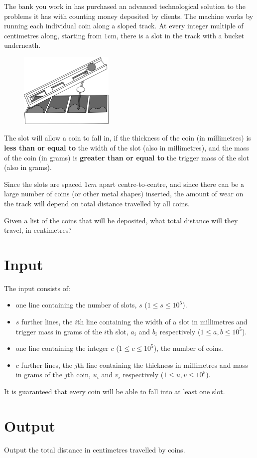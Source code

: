 
The bank you work in has purchased an advanced technological solution to the
problems it has with counting money deposited by clients.
The machine works by running each individual coin along a sloped track.
At every integer multiple of centimetres along, starting from $1$cm, there is
a slot in the track with a bucket underneath.

\begin{figure}[h!]
  \centering
  \includegraphics[width=0.4\textwidth]{illustration}
  \label{fig:automaticaccountant}
\end{figure}

The slot will allow a coin to fall in, if
   the thickness of the coin (in millimetres) is
        \textbf{less than or equal to} the width of the slot
        (also in millimetres),
and
   the mass of the coin (in grams) is \textbf{greater than or equal to}
        the trigger mass of the slot (also in grams).

Since the slots are spaced $1cm$ apart centre-to-centre, and since there can be
a large number of coins (or other metal shapes) inserted, the amount of wear
on the track will depend on total distance travelled by all coins.

Given a list of the coins that will be deposited, what total distance will they
travel, in centimetres?

\section*{Input}

The input consists of:
\begin{itemize}
  \item one line containing the number of slots, $s$ ($1 \leq s \leq 10^5 $).
  \item $s$ further lines, the $i$th line containing the width of a slot in millimetres
        and trigger mass in grams of the $i$th slot, $a_i$ and $b_i$ respectively 
        ($1 \le a, b \le 10^5$).
  \item one line containing the integer $c$ ($1 \leq c \leq 10^5 $), the number
        of coins.
  \item $c$ further lines, the $j$th line containing the thickness in millimetres and mass
        in grams of the $j$th coin, $u_i$ and $v_i$ respectively
        ($1 \le u, v \le 10^5$).
\end{itemize}

It is guaranteed that every coin will be able to fall into at least one slot.

\section*{Output}

Output the total distance in centimetres travelled by coins.

